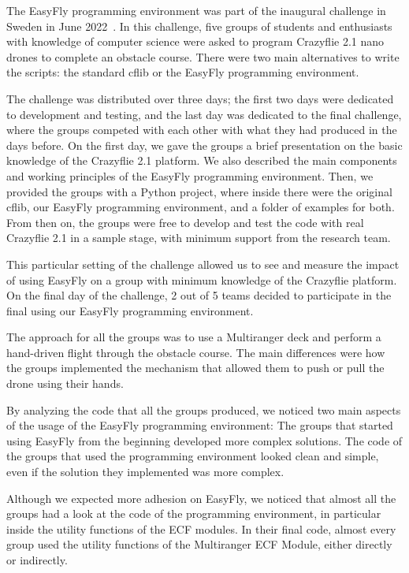 The EasyFly programming environment was part of the inaugural challenge in Sweden in June 2022~\cite{dronearenaChallenge}. 
In this challenge, five groups of students and enthusiasts with knowledge of computer science were asked to program Crazyflie 2.1 nano drones to complete an obstacle course.
There were two main alternatives to write the scripts: the standard cflib or the EasyFly programming environment. 

The challenge was distributed over three days; the first two days were dedicated to development and testing, and the last day was dedicated to the final challenge, where the groups competed with each other with what they had produced in the days before.
On the first day, we gave the groups a brief presentation on the basic knowledge of the Crazyflie 2.1 platform. 
We also described the main components and working principles of the EasyFly programming environment.
Then, we provided the groups with a Python project, where inside there were the original cflib, our EasyFly programming environment, and a folder of examples for both.
From then on, the groups were free to develop and test the code with real Crazyflie 2.1 in a sample stage, with minimum support from the research team.

This particular setting of the challenge allowed us to see and measure the impact of using EasyFly on a group with minimum knowledge of the Crazyflie platform. 
On the final day of the challenge, 2 out of 5 teams decided to participate in the final using our EasyFly programming environment. 

The approach for all the groups was to use a Multiranger deck and perform a hand-driven flight through the obstacle course.
The main differences were how the groups implemented the mechanism that allowed them to push or pull the drone using their hands.

By analyzing the code that all the groups produced, we noticed two main aspects of the usage of the EasyFly programming environment:
The groups that started using EasyFly from the beginning developed more complex solutions.
The code of the groups that used the programming environment looked clean and simple, even if the solution they implemented was more complex.

Although we expected more adhesion on EasyFly, we noticed that almost all the groups had a look at the code of the programming environment, in particular inside the utility functions of the ECF modules. 
In their final code, almost every group used the utility functions of the Multiranger ECF Module, either directly or indirectly.

